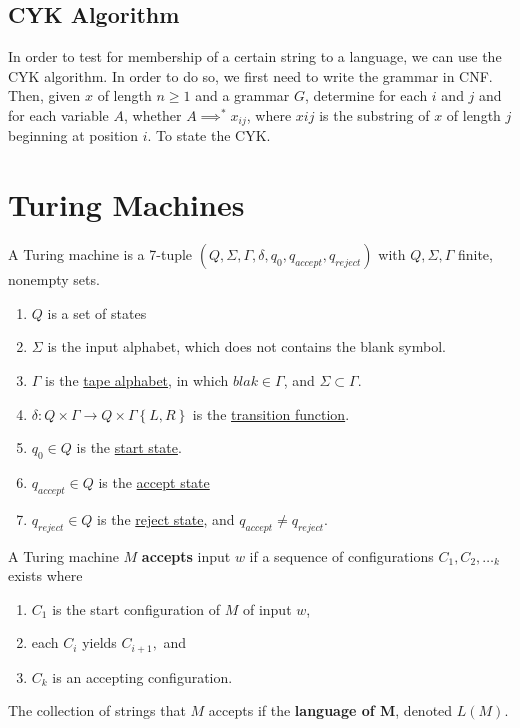 \documentclass[a4paper]{article}
\begin{document}
\subsection{CYK Algorithm} %
\label{sub:CYK Algorithm}
In order to test for membership of a certain string to a language, we can use the CYK algorithm. In order to do so, we first need to write the grammar in CNF. Then, given $x$ of length $n \geq 1$ and a grammar $G$, determine for each $i$ and $j$ and for each variable $A$, whether $A\implies^* x_{ij}$, where $xij$ is the substring of $x$ of length $j$ beginning at position $i$. To state the CYK.
\section{Turing Machines} %
\label{sec:Turing Machines}
A Turing machine is a 7-tuple $(Q,\Sigma,\Gamma,\delta,q_0,q_{accept},q_{reject})$ with $Q,\Sigma,\Gamma$ finite, nonempty sets.
\begin{enumerate}
 \item $Q$ is a set of states
  \item $\Sigma$ is the input alphabet, which does not contains the blank symbol.
  \item $\Gamma$ is the \underline{tape alphabet}, in which $blak \in \Gamma$, and $\Sigma \subset \Gamma$.
  \item $\delta: Q \times \Gamma \rightarrow Q \times\Gamma\left\{ L,R \right\} $ is the \underline{transition function}.
  \item $q_0 \in Q$ is the \underline{start state}.
  \item $q_{accept} \in Q$ is the \underline{accept state}
  \item $q_{reject} \in Q$ is the \underline{reject state}, and $q_{accept} \neq q_{reject}$.
\end{enumerate}
A Turing machine $M$ {\bf accepts } input $w$ if a sequence of configurations $C_1,C_2,\dotsc_k$ exists where
\begin{enumerate}
  \item $C_1$ is the start configuration of $M$ of input $w$,
  \item each $C_i$ yields $C_{i+1},$ and 
  \item $C_k$ is an accepting configuration.
\end{enumerate}
The collection of strings that $M$ accepts if the {\bf language of M}, denoted $L(M)$. \\
\end{document}
